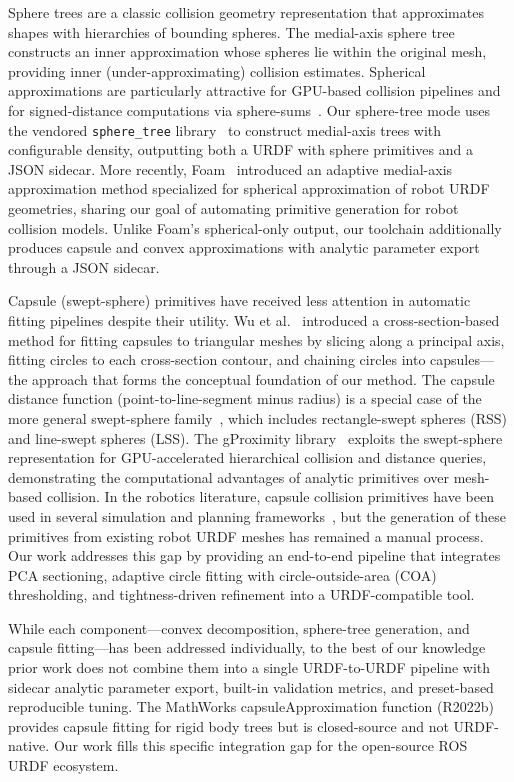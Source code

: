 Sphere trees are a classic collision geometry representation that approximates shapes with hierarchies of bounding spheres.
The medial-axis sphere tree~\cite{bradshaw2002sphere, mlund_spheretree} constructs an inner approximation whose spheres lie within the original mesh, providing inner (under-approximating) collision estimates.
Spherical approximations are particularly attractive for GPU-based collision pipelines and for signed-distance computations via sphere-sums~\cite{koptev2023neural}.
Our sphere-tree mode uses the vendored \texttt{sphere\_tree} library~\cite{mlund_spheretree} to construct medial-axis trees with configurable density, outputting both a URDF with sphere primitives and a JSON sidecar.
More recently, Foam~\cite{coumar2025foam} introduced an adaptive medial-axis approximation method specialized for spherical approximation of robot URDF geometries, sharing our goal of automating primitive generation for robot collision models. Unlike Foam's spherical-only output, our toolchain additionally produces capsule and convex approximations with analytic parameter export through a JSON sidecar.

Capsule (swept-sphere) primitives have received less attention in automatic fitting pipelines despite their utility.
Wu et al.~\cite{wu2018capsule} introduced a cross-section-based method for fitting capsules to triangular meshes by slicing along a principal axis, fitting circles to each cross-section contour, and chaining circles into capsules---the approach that forms the conceptual foundation of our method.
The capsule distance function (point-to-line-segment minus radius) is a special case of the more general swept-sphere family~\cite{larsen2000ssv}, which includes rectangle-swept spheres (RSS) and line-swept spheres (LSS).
The gProximity library~\cite{lauterbach2010gproximity} exploits the swept-sphere representation for GPU-accelerated hierarchical collision and distance queries, demonstrating the computational advantages of analytic primitives over mesh-based collision. In the robotics literature, capsule collision primitives have been used in several simulation and planning frameworks~\cite{drake}, but the generation of these primitives from existing robot URDF meshes has remained a manual process.
Our work addresses this gap by providing an end-to-end pipeline that integrates PCA sectioning, adaptive circle fitting with circle-outside-area (COA) thresholding, and tightness-driven refinement into a URDF-compatible tool.

While each component---convex decomposition, sphere-tree generation, and capsule fitting---has been addressed individually, to the best of our knowledge prior work does not combine them into a single URDF-to-URDF pipeline with sidecar analytic parameter export, built-in validation metrics, and preset-based reproducible tuning. The MathWorks capsuleApproximation function (R2022b) provides capsule fitting for rigid body trees but is closed-source and not URDF-native. Our work fills this specific integration gap for the open-source ROS URDF ecosystem.
